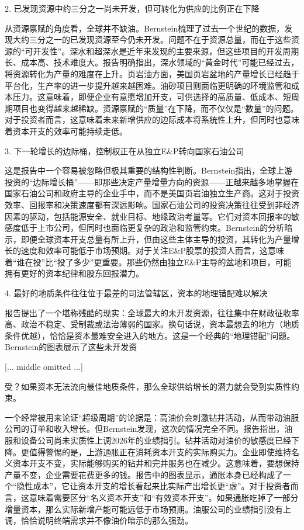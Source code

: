 \documentclass[11pt]{ctexart}
\begin{document}
2. 已发现资源中约三分之一尚未开发，但可转化为供应的比例正在下降

从资源禀赋的角度看，全球并不缺油。Bernstein梳理了过去一个世纪的数据，发现大约三分之一的已发现资源至今仍未开发。问题不在于资源总量，而在于这些资源的“可开发性”。深水和超深水是近年来发现的主要来源，但这些项目的开发周期长、成本高、技术难度大。报告明确指出，深水领域的“黄金时代”可能已经过去，将资源转化为产量的难度在上升。页岩油方面，美国页岩盆地的产量增长已经趋于平台化，生产率的进一步提升越来越困难。油砂项目则面临更明确的环境监管和成本压力。这意味着，即便企业有意愿增加开支，可供选择的高质量、低成本、短周期项目也变得越来越稀缺。资源禀赋的“质量”在下降，而不仅仅是“数量”的问题。对于投资者而言，这意味着未来新增供应的边际成本将系统性上升，但同时也意味着资本开支的效率可能持续走低。

3. 下一轮增长的边际桶，控制权正在从独立E\&P转向国家石油公司

这是报告中一个容易被忽略但极其重要的结构性判断。Bernstein指出，全球上游投资的“边际增长桶”——即那些决定产量增量方向的资源——正越来越多地掌握在国家石油公司和政府主导的企业手中，而不是美国页岩油独立生产商。这对于投资效率、回报率和决策速度都有深远影响。国家石油公司的投资决策往往受到非经济因素的驱动，包括能源安全、就业目标、地缘政治考量等。它们对资本回报率的敏感度低于上市公司，但同时也面临更复杂的政治和监管约束。Bernstein的分析暗示，即便全球资本开支总量有所上升，但由这些主体主导的投资，其转化为产量增长的速度和效率可能低于市场预期。对于关注E\&P股票的投资人而言，这意味着“谁在投”比“投了多少”更重要。那些仍然由独立E\&P主导的盆地和项目，可能拥有更好的资本纪律和股东回报潜力。

4. 最好的地质条件往往位于最差的司法管辖区，资本的地理错配难以解决

报告提出了一个堪称残酷的现实：全球最大的未开发资源，往往集中在财政征收率高、政治不稳定、受制裁或法治薄弱的国家。换句话说，资本最想去的地方（地质条件优越），恰恰是资本最难安全进入的地方。这是一个经典的“地理错配”问题。Bernstein的图表展示了这些未开发资

[... middle omitted ...]

受？如果资本无法流向最佳地质条件，那么全球供给增长的潜力就会受到实质性约束。

一个经常被用来论证“超级周期”的论据是：高油价会刺激钻井活动，从而带动油服公司的订单和收入增长。但Bernstein发现，这次的情况完全不同。报告指出，油服和设备公司尚未实质性上调2026年的业绩指引。钻井活动对油价的敏感度已经下降。更值得警惕的是，上游通胀正在消耗资本开支的实际购买力。企业即使维持名义资本开支不变，实际能够购买的钻井和完井服务也在减少。这意味着，要想保持产量不变，企业需要花费更多的钱。报告中的图表显示，通胀本身已经构成了一个“隐性成本”，它让资本开支的增长看起来比实际产出增长更“虚”。对于投资者而言，这意味着需要区分“名义资本开支”和“有效资本开支”。如果通胀吃掉了一部分增量资本，那么实际新增产能可能远低于市场预期。油服公司的业绩指引没有上调，恰恰说明终端需求并不像油价暗示的那么强劲。
\end{document}
